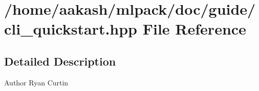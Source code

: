 \section{/home/aakash/mlpack/doc/guide/cli\+\_\+quickstart.hpp File Reference}
\label{cli__quickstart_8hpp}


\subsection{Detailed Description}
\begin{DoxyAuthor}{Author}
Ryan Curtin 
\end{DoxyAuthor}
